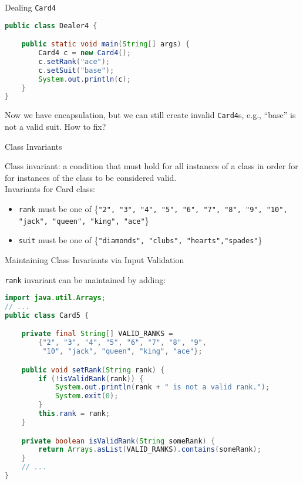 \documentclass{beamer}
\begin{document}
\begin{frame}[fragile]{Dealing {\tt Card4}}


\begin{lstlisting}[language=Java]
public class Dealer4 {

    public static void main(String[] args) {
        Card4 c = new Card4();
        c.setRank("ace");
        c.setSuit("base");
        System.out.println(c);
    }
}
\end{lstlisting}

Now we have encapsulation, but we can still create invalid {\tt Card4}s, e.g., ``base'' is not a valid suit.  How to fix?

\end{frame}

\begin{frame}[fragile]{Class Invariants}


Class invariant: a condition that must hold for all instances of a class in order for for instances of the class to be considered valid.\\
\vspace{.1in}
Invariants for Card class:
\begin{itemize}
\item {\tt rank} must be one of \{{\tt "2", "3", "4", "5", "6", "7", "8", "9",
         "10", "jack", "queen", "king", "ace"}\}
\item {\tt suit} must be one of \{{\tt "diamonds", "clubs", "hearts","spades"}\}
\end{itemize}


\end{frame}

\begin{frame}[fragile]{Maintaining Class Invariants via Input Validation}


\vspace{-.05in}
{\tt rank} invariant can be maintained by adding:

\begin{lstlisting}[language=Java]
import java.util.Arrays;
// ...
public class Card5 {

    private final String[] VALID_RANKS =
        {"2", "3", "4", "5", "6", "7", "8", "9",
         "10", "jack", "queen", "king", "ace"};

    public void setRank(String rank) {
        if (!isValidRank(rank)) {
            System.out.println(rank + " is not a valid rank.");
            System.exit(0);
        }
        this.rank = rank;
    }

    private boolean isValidRank(String someRank) {
        return Arrays.asList(VALID_RANKS).contains(someRank);
    }
    // ...
}
\end{lstlisting}

\end{frame}
\end{document}
